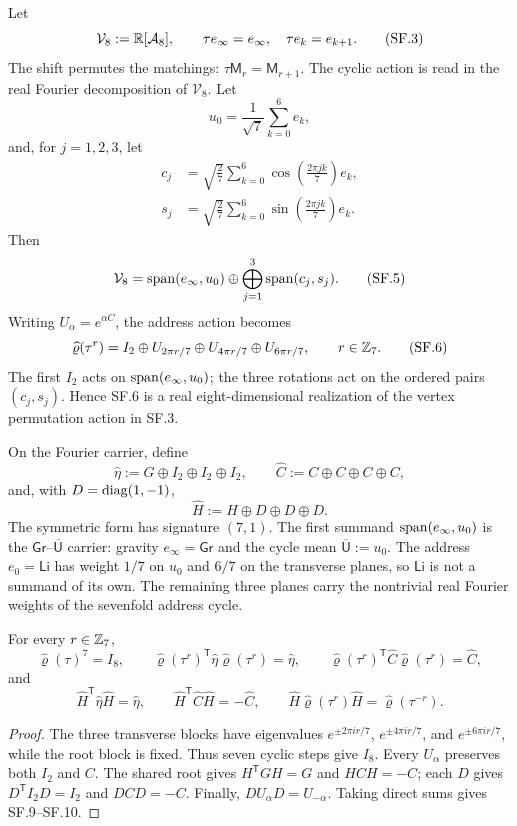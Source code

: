 \documentclass[10pt]{article}
\newcommand{\hateta}{\widehat\eta}
\newcommand{\hatC}{\widehat C}
\newcommand{\hatrho}{\widehat\varrho}
\newcommand{\hatH}{\widehat H}
\newcommand{\Ubar}{\overline{\mathsf U}}
\begin{document}
Let
\[
\mathcal V_8:=\mathbb R[\mathcal A_8],
\qquad
\tau e_\infty=e_\infty,\quad \tau e_k=e_{k+1}.
\tag{SF.3}
\]
The shift permutes the matchings: $\tau\mathsf M_r=\mathsf M_{r+1}$.
The cyclic action is read in the real Fourier decomposition of
$\mathcal V_8$. Let
\[
u_0=\frac1{\sqrt7}\sum_{k=0}^{6}e_k,
\]
and, for $j=1,2,3$, let
\[
\begin{aligned}
c_j&=\sqrt{\frac27}\sum_{k=0}^{6}
\cos\!\left(\frac{2\pi jk}{7}\right)e_k,\\
s_j&=\sqrt{\frac27}\sum_{k=0}^{6}
\sin\!\left(\frac{2\pi jk}{7}\right)e_k.
\end{aligned}
\tag{SF.4}
\]
Then
\[
\mathcal V_8=\operatorname{span}(e_\infty,u_0)\oplus
\bigoplus_{j=1}^{3}\operatorname{span}(c_j,s_j).
\tag{SF.5}
\]
Writing $U_\alpha=e^{\alpha C}$, the address action becomes
\[
\hatrho(\tau^r)=I_2\oplus U_{2\pi r/7}\oplus
U_{4\pi r/7}\oplus U_{6\pi r/7},
\qquad r\in\ZZ_7.
\tag{SF.6}
\]
The first $I_2$ acts on $\operatorname{span}(e_\infty,u_0)$; the three rotations act on
the ordered pairs $(c_j,s_j)$. Hence SF.6 is a real eight-dimensional
realization of the vertex permutation action in SF.3.

\sharedroot

On the Fourier carrier, define
\[
\hateta:=G\oplus I_2\oplus I_2\oplus I_2,
\qquad
\hatC:=C\oplus C\oplus C\oplus C,
\tag{SF.7}
\]
and, with $D=\operatorname{diag}(1,-1)$,
\[
\hatH:=H\oplus D\oplus D\oplus D.
\tag{SF.8}
\]
The symmetric form has signature $(7,1)$. The first summand
$\operatorname{span}(e_\infty,u_0)$ is the $\mathsf{Gr}$--$\Ubar$ carrier: gravity
$e_\infty=\mathsf{Gr}$ and the cycle mean $\Ubar:=u_0$. The address
$e_0=\mathsf{Li}$ has weight $1/7$ on $u_0$ and $6/7$ on the transverse planes,
so $\mathsf{Li}$ is not a summand of its own. The remaining three planes carry
the nontrivial real Fourier weights of the sevenfold address cycle.

\begin{theorem}
For every $r\in\mathbb Z_7$,
\[
\hatrho(\tau)^7=I_8,
\qquad
\hatrho(\tau^r)^{\mathsf T}\hateta\hatrho(\tau^r)=\hateta,
\qquad
\hatrho(\tau^r)^{\mathsf T}\hatC\hatrho(\tau^r)=\hatC,
\tag{SF.9}
\]
and
\[
\hatH^{\mathsf T}\hateta\hatH=\hateta,
\qquad
\hatH^{\mathsf T}\hatC\hatH=-\hatC,
\qquad
\hatH\hatrho(\tau^r)\hatH=\hatrho(\tau^{-r}).
\tag{SF.10}
\]
\end{theorem}

\begin{proof}
The three transverse blocks have eigenvalues
$e^{\pm2\pi i r/7}$, $e^{\pm4\pi i r/7}$, and
$e^{\pm6\pi i r/7}$, while the root block is fixed. Thus seven cyclic
steps give $I_8$. Every $U_\alpha$ preserves both $I_2$ and $C$.
The shared root gives $H^{\mathsf T}GH=G$ and $HCH=-C$; each $D$ gives
$D^{\mathsf T}I_2D=I_2$ and $DCD=-C$. Finally, $DU_\alpha D=U_{-\alpha}$.
Taking direct sums gives SF.9--SF.10.
\end{proof}
\end{document}
